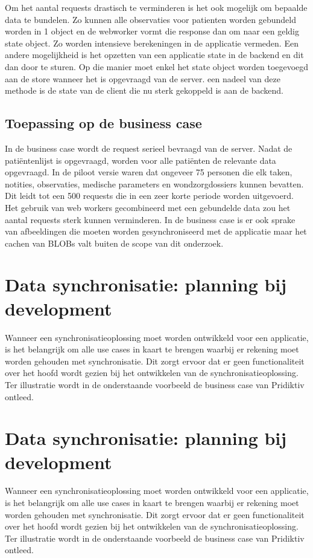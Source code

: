 Om het aantal requests drastisch te verminderen is het ook mogelijk om bepaalde data te bundelen. Zo kunnen alle observaties voor patienten worden gebundeld worden in 1 object en de webworker vormt die response dan om naar een geldig state object. Zo worden intensieve berekeningen in de applicatie vermeden. Een andere mogelijkheid is het opzetten van een applicatie state in de backend en dit dan door te sturen. Op die manier moet enkel het state object worden toegevoegd aan de store wanneer het is opgevraagd van de server. een nadeel van deze methode is de state van de client die nu sterk gekoppeld is aan de backend.

\subsection{Toepassing op de business case}
In de business case wordt de request serieel bevraagd van de server. Nadat de pati\"entenlijst is opgevraagd, worden voor alle pati\"enten de relevante data opgevraagd. In de piloot versie waren dat ongeveer 75 personen die elk taken, notities, observaties, medische parameters en wondzorgdossiers kunnen bevatten. Dit leidt tot een 500 requests die in een zeer korte periode worden uitgevoerd. Het gebruik van web workers \autocite{webworker-reference} gecombineerd met een gebundelde data zou het aantal requests sterk kunnen verminderen. In de business case is er ook sprake van afbeeldingen die moeten worden gesynchroniseerd met de applicatie maar het cachen van BLOBs valt buiten de scope van dit onderzoek.

\section{Data synchronisatie: planning bij development}
Wanneer een synchronisatieoplossing moet worden ontwikkeld voor een applicatie, is het belangrijk om alle use cases in kaart te brengen waarbij er rekening moet worden gehouden met synchronisatie. Dit zorgt ervoor dat er geen functionaliteit over het hoofd wordt gezien bij het ontwikkelen van de synchronisatieoplossing. Ter illustratie wordt in de onderstaande voorbeeld de business case van Pridiktiv ontleed.

\section{Data synchronisatie: planning bij development}
Wanneer een synchronisatieoplossing moet worden ontwikkeld voor een applicatie, is het belangrijk om alle use cases in kaart te brengen waarbij er rekening moet worden gehouden met synchronisatie. Dit zorgt ervoor dat er geen functionaliteit over het hoofd wordt gezien bij het ontwikkelen van de synchronisatieoplossing. Ter illustratie wordt in de onderstaande voorbeeld de business case van Pridiktiv ontleed.


